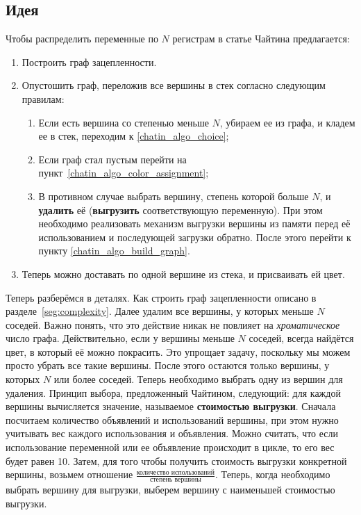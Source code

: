 \subsection{Идея}

Чтобы распределить переменные по $N$ регистрам в статье Чайтина предлагается:

\begin{enumerate}
    \item Построить граф зацепленности.\label{chatin_algo_build_graph}
    \item Опустошить граф, переложив все вершины в стек согласно следующим правилам: \label{chatin_algo_choice}\begin{enumerate}
        \item Если есть вершина со степенью меньше $N$, убираем ее из графа, и кладем ее в стек, переходим
        к \ref{chatin_algo_choice};
        \item Если граф стал пустым перейти на пункт~\ref{chatin_algo_color_assignment};
        \item В противном случае выбрать вершину, степень которой больше $N$, и \textbf{удалить} её (\textbf{выгрузить} соответствующую переменную).
        При этом необходимо реализовать механизм выгрузки вершины из памяти перед её использованием и
        последующей загрузки обратно. После этого перейти к пункту \ref{chatin_algo_build_graph}.
        \label{chatin_algo_spill}
    \end{enumerate}

    \item Теперь можно доставать по одной вершине из стека, и присваивать ей цвет. \label{chatin_algo_color_assignment}
\end{enumerate}

Теперь разберёмся в деталях. Как строить граф зацепленности описано в разделе~\ref{seg:complexity}. Далее удалим все вершины, у
которых меньше $N$ соседей. Важно понять, что это действие никак не повлияет на \textit{хроматическое} число графа. Действительно,
если у вершины меньше $N$ соседей, всегда найдётся цвет, в который её можно покрасить.
Это упрощает задачу, поскольку мы можем просто убрать все такие вершины.
После этого остаются только вершины, у которых $N$ или более соседей.
Теперь необходимо выбрать одну из вершин для удаления.
Принцип выбора, предложенный Чайтином, следующий: для каждой вершины вычисляется значение, называемое \textbf{стоимостью выгрузки}.
Сначала посчитаем количество объявлений и использований вершины, при этом нужно учитывать вес каждого использования и объявления.
Можно считать, что если использование переменной или ее объявление происходит в цикле, то его вес будет равен 10.
Затем, для того чтобы получить стоимость выгрузки конкретной вершины, возьмем отношение
$\frac{\textit{количество использований}}{\textit{степень вершины}}$.
Теперь, когда необходимо выбрать вершину для выгрузки, выберем вершину с наименьшей стоимостью выгрузки.


